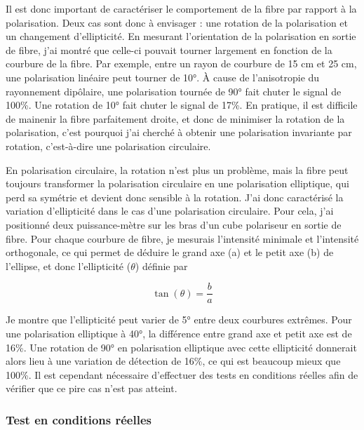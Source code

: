 Il est donc important de caractériser le comportement de la fibre par rapport à la polarisation. Deux cas sont donc à envisager : une rotation de la polarisation et un changement d'ellipticité. En mesurant l'orientation de la polarisation en sortie de fibre, j'ai montré que celle-ci pouvait tourner largement en fonction de la courbure de la fibre. Par exemple, entre un rayon de courbure de 15 cm et 25 cm, une polarisation linéaire peut tourner de 10°. À cause de l'anisotropie du rayonnement dipôlaire, une polarisation tournée de 90° fait chuter le signal de 100\%. Une rotation de 10° fait chuter le signal de 17\%. En pratique, il est difficile de mainenir la fibre parfaitement droite, et donc de minimiser la rotation de la polarisation, c'est pourquoi j'ai cherché à obtenir une polarisation invariante par rotation, c'est-à-dire une polarisation circulaire.


En polarisation circulaire, la rotation n'est plus un problème, mais la fibre peut toujours transformer la polarisation circulaire en une polarisation elliptique, qui perd sa symétrie et devient donc sensible à la rotation. J'ai donc caractérisé la variation d'ellipticité dans le cas d'une polarisation circulaire. Pour cela, j'ai positionné deux puissance-mètre sur les bras d'un cube polariseur en sortie de fibre. Pour chaque courbure de fibre, je mesurais l'intensité minimale et l'intensité orthogonale, ce qui permet de déduire le grand axe (a) et le petit axe (b) de l'ellipse, et donc l'ellipticité ($\theta$) définie par

$$
\tan(\theta)=\frac{b}{a} 
$$

Je montre que l'ellipticité peut varier de 5° entre deux courbures extrêmes. Pour une polarisation elliptique à 40°, la différence entre grand axe et petit axe est de 16\%. Une rotation de 90° en polarisation elliptique avec cette ellipticité donnerait alors lieu à une variation de détection de 16\%, ce qui est beaucoup mieux que 100\%. Il est cependant nécessaire d'effectuer des tests en conditions réelles afin de vérifier que ce pire cas n'est pas atteint.

\subsubsection{Test en conditions réelles}

